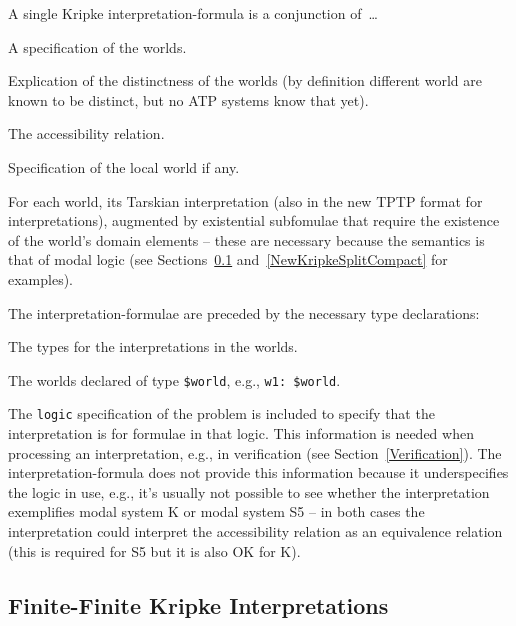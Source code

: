 \documentclass{easychair}
\newenvironment{packed_itemize}{
\vspace*{-0.3em}
\begin{itemize}
\setlength{\partopsep}{0pt}
\setlength{\itemsep}{1pt}
\setlength{\parskip}{0pt}
\setlength{\parsep}{0pt}
}{\end{itemize}}
\begin{document}
A single Kripke interpretation-formula is a conjunction of~\ldots
\begin{packed_itemize}
\item A specification of the worlds.
\item Explication of the distinctness of the worlds (by definition different world are known to
      be distinct, but no ATP systems know that yet).
\item The accessibility relation.
\item Specification of the local world if any.
\item For each world, its Tarskian interpretation (also in the new TPTP format for interpretations),
      augmented by existential subfomulae that require the existence of the world's domain 
      elements -- these are necessary because the semantics is that of modal logic (see
      Sections~\ref{NewKripkeFiniteFinite} and~\ref{NewKripkeSplitCompact} for examples).
\end{packed_itemize}
The interpretation-formulae are preceded by the necessary type declarations:
\begin{packed_itemize}
\item The types for the interpretations in the worlds.
\item The worlds declared of type {\tt \$world}, e.g., {\tt w1: \$world}.
\end{packed_itemize}

The {\tt logic} specification of the problem is included to specify that the interpretation is
for formulae in that logic.
This information is needed when processing an interpretation, e.g., in verification (see 
Section~\ref{Verification}). 
The interpretation-formula does not provide this information because it underspecifies the 
logic in use, e.g., it's usually not possible to see whether the interpretation exemplifies modal 
system K or modal system S5 -- in both cases the interpretation could interpret the accessibility 
relation as an equivalence relation (this is required for S5 but it is also OK for K).

\subsection{Finite-Finite Kripke Interpretations}
\label{NewKripkeFiniteFinite}
\end{document}
